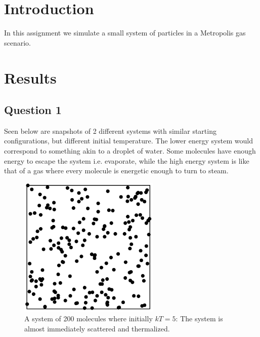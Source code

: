 \documentclass{article}
\author{\hwauthor}
\title{\hwtitle}
\date{\hwdate}
\begin{document}
\maketitle
\thispagestyle{fancy}

\section{Introduction}

In this assignment we simulate a small system of particles in a Metropolis gas scenario.

\section{Results}

\subsection{Question 1}

Seen below are snapshots of 2 different systems with similar starting configurations, but different initial temperature. 
The lower energy system would correspond to something akin to a droplet of water. Some molecules have enough energy to escape the system i.e. evaporate, while the high energy system is like that of a gas where every molecule is energetic enough to turn to steam.

\begin{figure}[!htb]
	\begin{center}
		\includegraphics[width=0.6\textwidth]{5kt_thermalized.pdf}
	\end{center}
	\caption{A system of 200 molecules where initially $kT = 5$: The system is almost immediately scattered and thermalized.}
\label{fig:qual}
\end{figure}
\FloatBarrier
\end{document}
